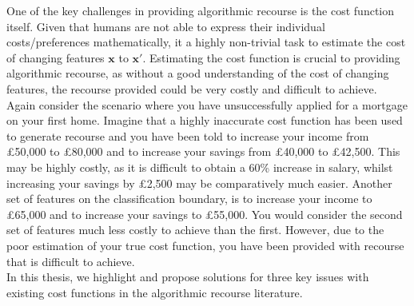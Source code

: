 One of the key challenges in providing algorithmic recourse is the cost function itself. Given that humans are not able to express their individual costs/preferences mathematically, it a highly non-trivial task to estimate the cost of changing features $\mathbf{x}$ to  $\mathbf{x}'$. Estimating the cost function is crucial to providing algorithmic recourse, as without a good understanding of the cost of changing features, the recourse provided could be very costly and difficult to achieve. Again consider the scenario where you have unsuccessfully applied for a mortgage on your first home. Imagine that a highly inaccurate cost function has been used to generate recourse and you have been told to increase your income from £50,000 to £80,000 and to increase your savings from £40,000 to £42,500. This may be highly costly, as it is difficult to obtain a 60\% increase in salary, whilst increasing your savings by £2,500 may be comparatively much easier. Another set of features on the classification boundary, is to increase your income to £65,000 and to increase your savings to £55,000. You would consider the second set of features much less costly to achieve than the first. However, due to the poor estimation of your true cost function, you have been provided with recourse that is difficult to achieve.\\

In this thesis, we highlight and propose solutions for three key issues with existing cost functions in the algorithmic recourse literature.

